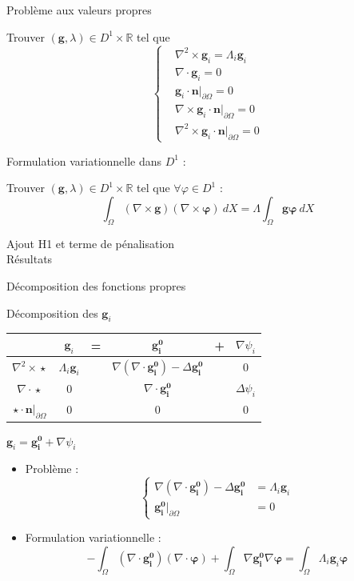 \documentclass{beamer}
\newcommand{\grad}{{\nabla}}
\newcommand{\laplace}{{\Delta}}
\newcommand{\rot}{{\nabla\times}}
\newcommand{\rott}{{\nabla^2\times}}
\renewcommand{\div}{{\nabla\cdot}}
\newcommand{\restr}{{\big\rvert_{\partial\Omega}}}
\begin{document}
\begin{frame}{Problème aux valeurs propres}
\begin{block}{Trouver $(\mathbf{g},\lambda)\in D^1\times \mathbb{R}$ tel que}
\[\left\{\begin{aligned}
&\rott  \mathbf{g}_i = \Lambda_i \mathbf{g}_i\\
&\div \mathbf{g}_i = 0\\
&\mathbf{g}_i\cdot \mathbf{n}\restr = 0\\
&\rot \mathbf{g}_i\cdot \mathbf{n}\restr = 0\\
&\rott  \mathbf{g}_i\cdot \mathbf{n}\restr = 0
\end{aligned}\right.\]
\end{block}
Formulation variationnelle dans $D^1$ :
\begin{block}{Trouver $(\mathbf{g},\lambda)\in D^1\times \mathbb{R}$ tel que $\forall \varphi\in D^1$ :}
\[ \int_\Omega (\rot \mathbf{g})(\rot\bm{\varphi})\ dX = \Lambda\int_\Omega \mathbf{g}\bm{\varphi}\ dX \]
\end{block}
\end{frame}

\begin{frame}
Ajout H1 et terme de pénalisation\\
Résultats
\end{frame}

\begin{frame}{Décomposition des fonctions propres}
\begin{block}{Décomposition des $\mathbf{g}_i$}
\begin{center}
\begin{tabular}{c|ccccc}
& $\mathbf{g}_i$ & = & $\mathbf{\mathbf{g}_i^0}$ & + & $\grad\psi_i$ \\ \hline
$\rott\star$ & $\Lambda_i \mathbf{g}_i$ & & $\grad(\div \mathbf{\mathbf{g}_i^0})-\laplace \mathbf{\mathbf{g}_i^0}$ & & 0\\ \hline
$\div\star$ & 0 & & $\div \mathbf{\mathbf{g}_i^0}$ & & $\laplace\psi_i$\\ \hline
$\star\cdot \mathbf{n}\restr$ & 0 & & 0 & & 0
\end{tabular}
\end{center}
\end{block}
\begin{block}{$\mathbf{g}_i=\mathbf{\mathbf{g}_i^0}+\grad\psi_i$}
\begin{itemize}
\item Problème :
\[\left\{\begin{aligned}
\grad(\div \mathbf{\mathbf{g}_i^0})-\laplace \mathbf{\mathbf{g}_i^0} &= \Lambda_i \mathbf{g}_i\\
\mathbf{\mathbf{g}_i^0}\restr &= 0
\end{aligned}\right.\]
\item Formulation variationnelle :
\[ -\int_\Omega (\div \mathbf{\mathbf{g}_i^0})(\div\bm{\varphi}) + \int_\Omega \grad \mathbf{\mathbf{g}_i^0}\grad\bm{\varphi} = \int_\Omega \Lambda_i\mathbf{g}_i\bm{\varphi} \]
\end{itemize}
\end{block}
\end{frame}
\end{document}
